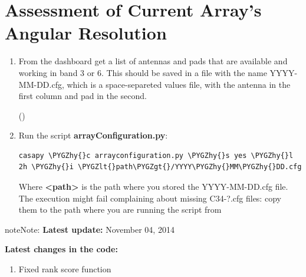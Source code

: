 \documentclass[a4paper,10pt,english]{sphinxmanual}
\def\PYGZlt{\char`\<}
\def\PYGZgt{\char`\>}
\def\PYGZhy{\char`\-}
\begin{document}
\section{Assessment of Current Array's Angular Resolution}
\label{apendix:assessment-of-current-array-s-angular-resolution}\label{apendix:current-conf}\begin{enumerate}
\item {} 
From the dashboard get a list of antennas and pads that are available and
working in band 3 or 6. This should be saved in a file with the name
YYYY-MM-DD.cfg, which is a space-separeted values file, with the antenna in the
first column and pad in the second.

()

\item {} 
Run the script \textbf{arrayConfiguration.py}:

\begin{Verbatim}[commandchars=\\\{\}]
casapy \PYGZhy{}c arrayconfiguration.py \PYGZhy{}s yes \PYGZhy{}l 2h \PYGZhy{}i \PYGZlt{}path\PYGZgt{}/YYYY\PYGZhy{}MM\PYGZhy{}DD.cfg
\end{Verbatim}

Where \textbf{\textless{}path\textgreater{}} is the path where you stored the YYYY-MM-DD.cfg file.
The execution might fail complaining about missing C34-?.cfg files: copy them
to the path where you are running the script from

\end{enumerate}

\begin{notice}{note}{Note:}
\textbf{Latest update:}
November 04, 2014

\textbf{Latest changes in the code:}
\begin{enumerate}
\item {} 
Fixed rank score function

\end{enumerate}
\end{notice}
\end{document}
